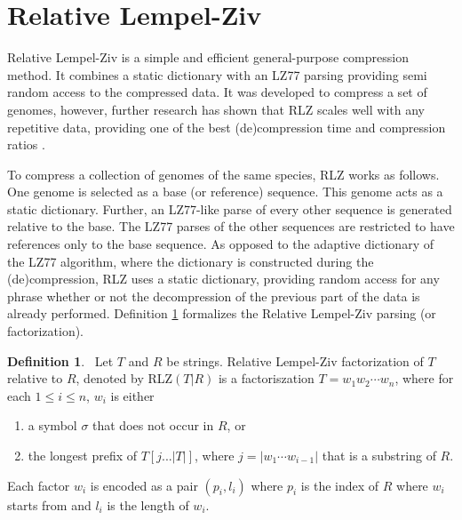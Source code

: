 \documentclass[english,twoside,censored,csm,algorithms-track-2020]{HYthesisML}
\theoremstyle{plain}
\theoremstyle{definition}
\newtheorem{definition}[theorem]{Definition}
\numberwithin{testexample}{chapter}
\begin{document}
\section{Relative Lempel-Ziv}

Relative Lempel-Ziv is a simple and efficient \citep{Deorowicz11} general-purpose \citep{Hoobin11}
compression method. It combines a static dictionary with an LZ77 parsing providing semi random
access to the compressed data. It was developed to compress a set of genomes, however, further
research has shown that RLZ scales well with any repetitive data, providing
one of the best (de)compression time and compression ratios \citep{Gagie16}.

To compress a collection of genomes of the same species, RLZ works as follows. One genome is selected
as a base (or reference) sequence. This genome acts as a static dictionary. Further, an LZ77-like parse of every other sequence
is generated relative to the base. The LZ77 parses of the other sequences are restricted to have
references only to the base sequence. As opposed to the adaptive dictionary
of the LZ77 algorithm, where the dictionary is constructed during the (de)compression, RLZ uses
a static dictionary, providing random access for any phrase whether or not the decompression
of the previous part of the data is already performed. Definition \ref{def-rlz} formalizes the
Relative Lempel-Ziv parsing (or factorization).




\begin{definition}~\label{def-rlz}
  Let $T$ and $R$ be strings. Relative Lempel-Ziv factorization of $T$ relative to $R$, denoted by
  RLZ$(T|R)$ is a factoriszation $T=w_1w_2\cdots w_n$, where for each $1\leq i \leq n$, $w_i$ is either
  \begin{enumerate}[leftmargin=28pt]
  \item a symbol $\sigma$ that does not occur in $R$, or
  \item the longest prefix of $T[j...|T|]$, where $j = |w_1\cdots w_{i-1}|$ that is a substring of $R$.
  \end{enumerate}
  Each factor $w_i$ is encoded as a pair $(p_i,l_i)$ where $p_i$ is the index of $R$ where $w_i$
  starts from and $l_i$ is the length of $w_i$.
\end{definition}
\end{document}
